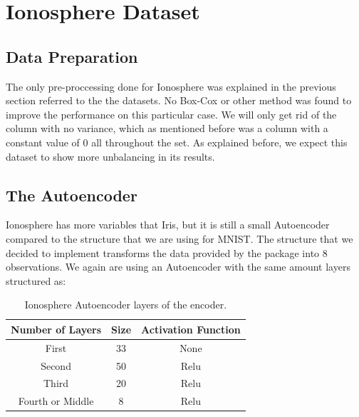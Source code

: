\documentclass[12pt]{report}
\begin{document}
\section{Ionosphere Dataset}
\subsection{Data Preparation}

The only pre-proccessing done for Ionosphere was explained in the previous section referred to the the datasets. No Box-Cox or other method was found to improve the performance on this particular case. We will only get rid of the column with no variance, which as mentioned before was a column with a constant value of 0 all throughout the set. As explained before, we expect this dataset to show more unbalancing in its results.

\subsection{The Autoencoder}

Ionosphere has more variables that Iris, but it is still a small Autoencoder compared to the structure that we are using for MNIST. The structure that we decided to implement transforms the data provided by the package into 8 observations. We again are using an Autoencoder with the same amount layers structured as:  \newline

\begin{table}[H]
		\caption{Ionosphere Autoencoder layers of the encoder.}
	\begin{center}
	\label{tab:table_Ionosphere_auto_encoder}
		\begin{tabular}{c|c|c} %
			\textbf{Number of Layers} & \textbf{Size} & \textbf{Activation Function} \\
			\hline
			First & 33 & None\\
			Second & 50 & Relu\\
			Third & 20 & Relu\\
			Fourth or Middle & 8 & Relu\\
		\end{tabular}
	\end{center}
\end{table}
\end{document}
